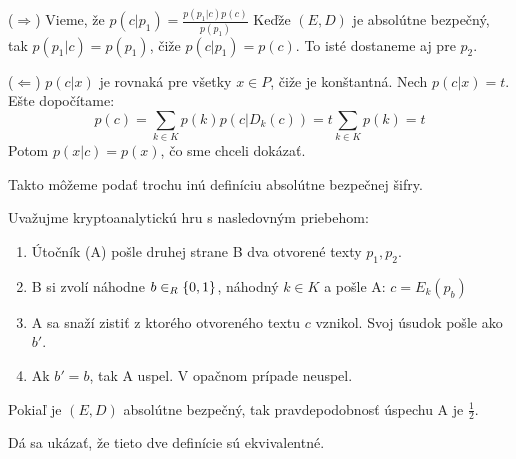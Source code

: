\begin{dokaz}
($\Rightarrow$) Vieme, že $p(c|p_1) = \frac{p(p_1|c) p(c)}{p(p_1)}$ Keďže $(E,D)$ je absolútne
bezpečný, tak $p(p_1|c) = p(p_1)$, čiže $p(c|p_1) = p(c)$. To isté dostaneme aj pre $p_2$.

($\Leftarrow$) $p(c|x)$ je rovnaká pre všetky $x \in P$, čiže je konštantná. Nech $p(c|x) = t$.
Ešte dopočítame:
$$p(c) = \displaystyle\sum_{k \in K} p(k) p(c|D_k(c)) = t \displaystyle\sum_{k \in K} p(k) = t$$
Potom $p(x|c) = p(x)$, čo sme chceli dokázať.
\end{dokaz}

Takto môžeme podať trochu inú definíciu absolútne bezpečnej šifry.

\begin{definicia}
Uvažujme kryptoanalytickú hru s nasledovným priebehom:
\begin{enumerate}
\item Útočník (A) pošle druhej strane B dva otvorené texty $p_1, p_2$.
\item B si zvolí náhodne $b \in_{R} \{0,1\}$, náhodný $k \in K$ a pošle A: $c = E_k(p_b)$
\item A sa snaží zistiť z ktorého otvoreného textu $c$ vznikol. Svoj úsudok pošle ako $b'$.
\item Ak $b' = b$, tak A uspel. V opačnom prípade neuspel.
\end{enumerate}
Pokiaľ je $(E,D)$ absolútne bezpečný, tak pravdepodobnosť úspechu A je $\frac{1}{2}$.
\end{definicia}

Dá sa ukázať, že tieto dve definície sú ekvivalentné.
